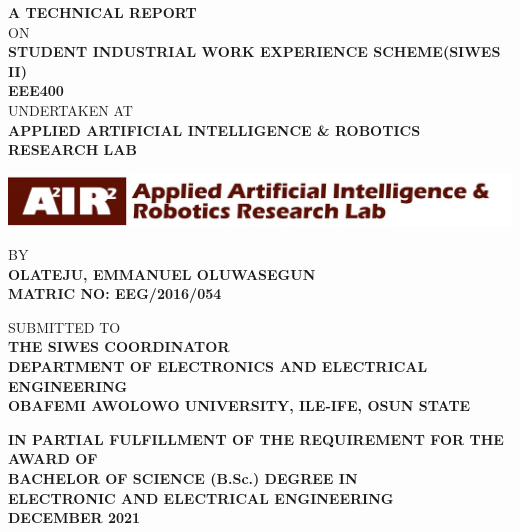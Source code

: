 \begin{titlepage}

\begin{center}

\large{ {\bf A TECHNICAL REPORT} \\ ON}\\
\large{ {\bf STUDENT INDUSTRIAL WORK EXPERIENCE SCHEME(SIWES II) \\ EEE400}}\\
\large{UNDERTAKEN AT}\\

\large{{\bf APPLIED ARTIFICIAL INTELLIGENCE \& ROBOTICS RESEARCH LAB}}\\
\vspace{.1in}

\includegraphics{air-logo}\\
\vspace{.1in}

\large{BY}\\
\large{{\bf OLATEJU, EMMANUEL OLUWASEGUN \\ MATRIC NO: EEG/2016/054}}\\
\vspace{.1in}

\large{SUBMITTED TO \\ {\bf THE SIWES COORDINATOR \\ DEPARTMENT OF ELECTRONICS AND ELECTRICAL ENGINEERING}}\\
\large{{\bf OBAFEMI AWOLOWO UNIVERSITY, ILE-IFE, OSUN STATE}}\\
\vspace{.1in}

\large{{\bf IN PARTIAL FULFILLMENT OF THE REQUIREMENT FOR THE AWARD OF}}\\
\large{{\bf BACHELOR OF SCIENCE (B.Sc.) DEGREE IN}}\\
\large{{\bf ELECTRONIC AND ELECTRICAL ENGINEERING}}\\
\large{{\bf DECEMBER 2021}}

\end{center}

\end{titlepage}